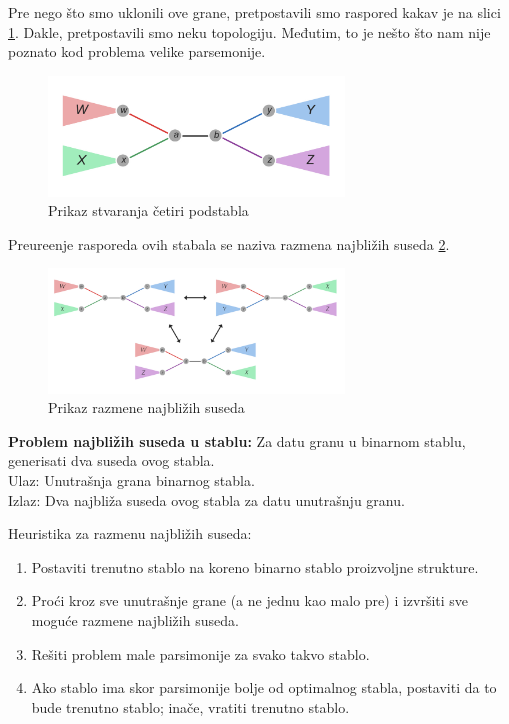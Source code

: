 Pre nego što smo uklonili ove grane, pretpostavili smo raspored kakav je na slici \ref{fig:pscp}. Dakle, pretpostavili smo neku topologiju. Međutim, to je nešto što nam nije poznato kod problema velike parsemonije.

\begin{figure}[h!]
\begin{center}
\includegraphics[width=0.7\textwidth]{poglavlja/7/slike/slika8.png}
\end{center}
\caption{Prikaz stvaranja \v{c}etiri podstabla}
\label{fig:pscp}
\end{figure}

Preure\dj enje rasporeda ovih stabala se naziva razmena najbli\v{z}ih suseda \ref{fig:psns}.

\begin{figure}[h!]
\begin{center}
\includegraphics[width=0.7\textwidth]{poglavlja/7/slike/slika9.png}
\end{center}
\caption{Prikaz razmene najbli\v{z}ih suseda}
\label{fig:psns}
\end{figure}

\begin{tcolorbox}
\textbf{Problem najbli\v{z}ih suseda u stablu:} Za datu granu u binarnom stablu, generisati dva suseda ovog stabla. \\
Ulaz: Unutra\v{s}nja grana binarnog stabla.\\
Izlaz: Dva najbli\v{z}a suseda ovog stabla za datu unutra\v{s}nju granu.
\end{tcolorbox}


Heuristika za razmenu najbli\v{z}ih suseda:
\begin{enumerate}
	\item Postaviti trenutno stablo na koreno binarno stablo proizvoljne strukture.
	\item Pro\'ci kroz sve unutra\v{s}nje grane (a ne jednu kao malo pre) i izvr\v{s}iti sve mogu\'ce razmene najbli\v{z}ih suseda.
	\item Re\v{s}iti problem male parsimonije za svako takvo stablo.
	\item Ako stablo ima skor parsimonije bolje od optimalnog stabla, postaviti da to bude trenutno stablo; ina\v{c}e, vratiti trenutno stablo.
\end{enumerate}


